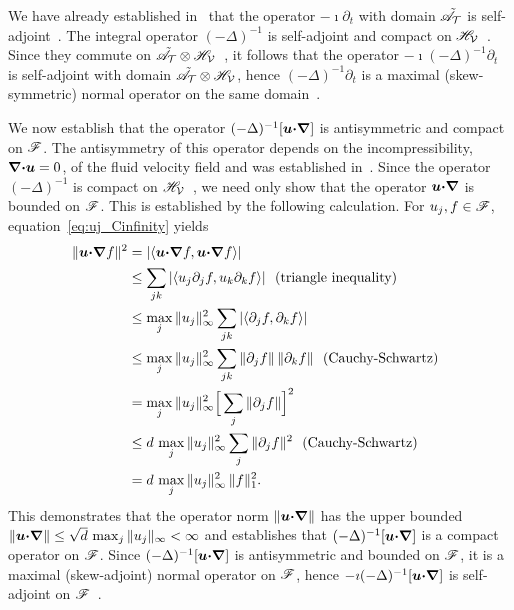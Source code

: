 \documentclass[amsa]{ipart}
\begin{document}
We have already established in~ that the
operator $-\imath\partial_t$ with domain $\tilde{\mathscr{A}}_{\mathcal{T}}$ is
self-adjoint~\cite{Stone:64}. The integral operator $(-\Delta)^{-1}$ 
is self-adjoint and compact on
$\mathscr{H}_{\mathcal{V}}$~\cite{Stakgold:BVP:2000}. Since they commute on
$\tilde{\mathscr{A}}_{\mathcal{T}}\otimes\mathscr{H}_{\mathcal{V}}$~\cite{Folland:99:RealAnalysis}, it 
follows that the operator $-\imath(-\Delta)^{-1}\partial_t$ is self-adjoint with domain
$\tilde{\mathscr{A}}_{\mathcal{T}}\otimes\mathscr{H}_{\mathcal{V}}$, hence $(-\Delta)^{-1}\partial_t$ is a maximal
(skew-symmetric) normal operator on the same domain~\cite{Stone:64}.




We now establish that the operator $(-\Delta)^{-1}[\boldsymbol{u}\mbox{\boldmath${\cdot}$}\mbox{\boldmath${\nabla}$}]$
is antisymmetric and compact on $\mathscr{F}$. The antisymmetry of this
operator depends on the incompressibility, $\mbox{\boldmath${\nabla}$}\mbox{\boldmath${\cdot}$}\boldsymbol{u}=0$, of
the fluid velocity field and was established
in~\cite{Bhattacharya:AAP:1999:951,Pavliotis:PHD_Thesis}. 
Since the operator $(-\Delta)^{-1}$ is compact on
$\mathscr{H}_{\mathcal{V}}$~\cite{Stakgold:BVP:2000}, we need only show that the
operator $\boldsymbol{u}\mbox{\boldmath${\cdot}$}\mbox{\boldmath${\nabla}$}$ is bounded on $\mathscr{F}$. This is established
by the following calculation. For $u_j,f\in\mathscr{F}$,
equation~\eqref{eq:uj_Cinfinity}  yields 
%
\begin{align}\label{eq:Second_Bound_A}
  \|\vecu\bcdot\bnabla f\|^2&=|\langle\vecu\bcdot\bnabla f,\vecu\bcdot\bnabla f\rangle| 
         \\
         &\leq\sum_{jk}|\langle u_j\partial_jf,u_k\partial_kf\rangle |~\text{ (triangle inequality) }
         \notag\\
         &\leq\max_j\|u_j\|_\infty^2\sum_{jk}|\langle\partial_jf,\partial_kf\rangle|
         \notag\\
         &\leq\max_j\|u_j\|_\infty^2\sum_{jk}\|\partial_jf\|\,\|\partial_kf\|
              ~\text{ (Cauchy-Schwartz) }~
         \notag\\
         &=\max_j\|u_j\|_\infty^2\Big[\sum_{j}\|\partial_jf\|\Big]^2
         \notag\\
         &\leq d\,\max_j\|u_j\|_\infty^2\sum_{j}\|\partial_jf\|^2
         ~\text{ (Cauchy-Schwartz) }~
         \notag\\
         &=d\,\max_j\|u_j\|_\infty^2\,\|f\|_1^2.
         \notag
\end{align}
%
This demonstrates that the operator norm $\|\boldsymbol{u}\mbox{\boldmath${\cdot}$}\mbox{\boldmath${\nabla}$}\|$ has
the upper bounded $\|\boldsymbol{u}\mbox{\boldmath${\cdot}$}\mbox{\boldmath${\nabla}$}\|\leq\sqrt{d}\,\max_j\|u_j\|_\infty<\infty$ and
establishes that $(-\Delta)^{-1}[\boldsymbol{u}\mbox{\boldmath${\cdot}$}\mbox{\boldmath${\nabla}$}]$ is a compact operator
on $\mathscr{F}$. Since $(-\Delta)^{-1}[\boldsymbol{u}\mbox{\boldmath${\cdot}$}\mbox{\boldmath${\nabla}$}]$ is
antisymmetric and bounded on $\mathscr{F}$, it is a maximal (skew-adjoint)
normal operator on $\mathscr{F}$, hence $-\imath(-\Delta)^{-1}[\boldsymbol{u}\mbox{\boldmath${\cdot}$}\mbox{\boldmath${\nabla}$}]$ is
self-adjoint on $\mathscr{F}$~\cite{Stone:64}. 
\end{document}
